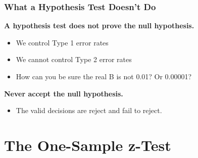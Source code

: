\documentclass[12pt, block=fill]{beamer}
\begin{document}
\begin{frame}
  \frametitle{What a Hypothesis Test Doesn't Do}

  \textbf{A hypothesis test does not prove the null hypothesis.}
  
  \begin{itemize}
  \item We control Type 1 error rates
  \item We cannot control Type 2 error rates
  \item How can you be sure the real B is not 0.01?  Or 0.00001?
  \end{itemize}
  
    \textbf{Never accept the null hypothesis.}
\begin{itemize}
\item The valid decisions are reject and fail to reject.
\end{itemize}

  
\end{frame}

\section{The One-Sample z-Test}
\end{document}
